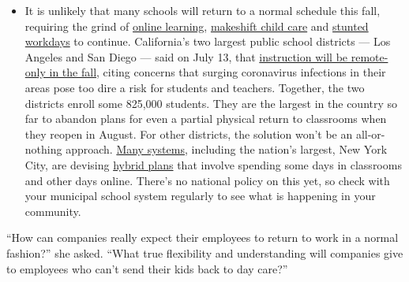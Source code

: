 \begin{itemize}
  \begin{itemize}
  \tightlist
  \item
    It is unlikely that many schools will return to a normal schedule
    this fall, requiring the grind of
    \href{https://www.nytimes3xbfgragh.onion/2020/06/05/us/coronavirus-education-lost-learning.html?action=click\&pgtype=Article\&state=default\&region=MAIN_CONTENT_3\&context=storylines_faq}{online
    learning},
    \href{https://www.nytimes3xbfgragh.onion/2020/05/29/us/coronavirus-child-care-centers.html?action=click\&pgtype=Article\&state=default\&region=MAIN_CONTENT_3\&context=storylines_faq}{makeshift
    child care} and
    \href{https://www.nytimes3xbfgragh.onion/2020/06/03/business/economy/coronavirus-working-women.html?action=click\&pgtype=Article\&state=default\&region=MAIN_CONTENT_3\&context=storylines_faq}{stunted
    workdays} to continue. California's two largest public school
    districts --- Los Angeles and San Diego --- said on July 13, that
    \href{https://www.nytimes3xbfgragh.onion/2020/07/13/us/lausd-san-diego-school-reopening.html?action=click\&pgtype=Article\&state=default\&region=MAIN_CONTENT_3\&context=storylines_faq}{instruction
    will be remote-only in the fall}, citing concerns that surging
    coronavirus infections in their areas pose too dire a risk for
    students and teachers. Together, the two districts enroll some
    825,000 students. They are the largest in the country so far to
    abandon plans for even a partial physical return to classrooms when
    they reopen in August. For other districts, the solution won't be an
    all-or-nothing approach.
    \href{https://bioethics.jhu.edu/research-and-outreach/projects/eschool-initiative/school-policy-tracker/}{Many
    systems}, including the nation's largest, New York City, are
    devising
    \href{https://www.nytimes3xbfgragh.onion/2020/06/26/us/coronavirus-schools-reopen-fall.html?action=click\&pgtype=Article\&state=default\&region=MAIN_CONTENT_3\&context=storylines_faq}{hybrid
    plans} that involve spending some days in classrooms and other days
    online. There's no national policy on this yet, so check with your
    municipal school system regularly to see what is happening in your
    community.
  \end{itemize}
\end{itemize}

``How can companies really expect their employees to return to work in a
normal fashion?'' she asked. ``What true flexibility and understanding
will companies give to employees who can't send their kids back to day
care?''

